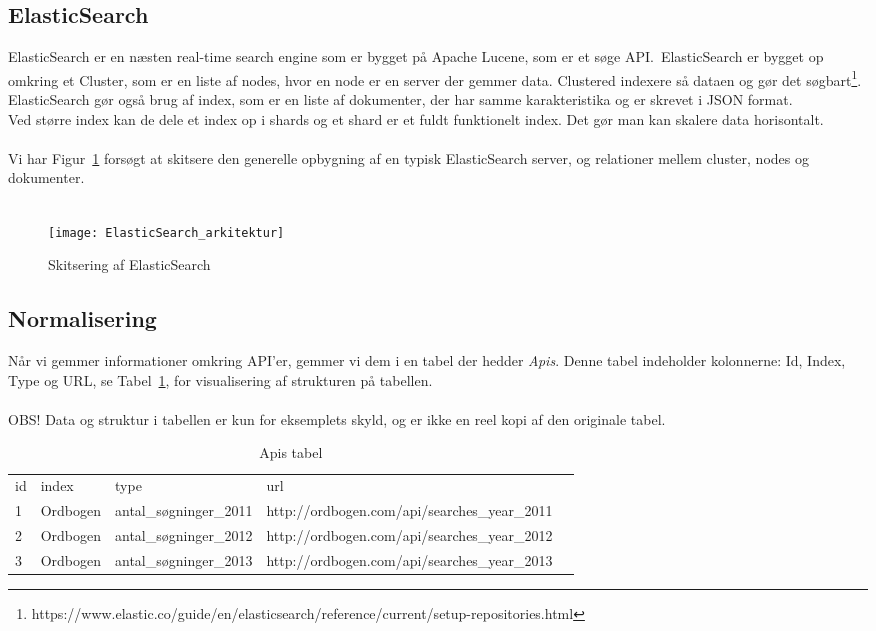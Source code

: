 \subsection{ElasticSearch}
ElasticSearch er en næsten real-time search engine som er bygget på Apache Lucene, som er et søge API.\
ElasticSearch er bygget op omkring et Cluster, som er en liste af nodes, hvor en node er en server der gemmer data. Clustered indexere så dataen og gør det søgbart\footnote{https://www.elastic.co/guide/en/elasticsearch/reference/current/setup-repositories.html}.
ElasticSearch gør også brug af index, som er en liste af dokumenter, der har samme karakteristika og er skrevet i JSON format.
\\
Ved større index kan de dele et index op i shards og et shard er et fuldt funktionelt index. Det gør man kan skalere data horisontalt.
\\\\
Vi har Figur~\ref{fig:elasticsearch-arkitektur} forsøgt at skitsere den generelle opbygning af en typisk ElasticSearch server, og relationer mellem cluster, nodes og dokumenter.
\\\\
\begin{figure}[here]
    \texttt{[image: ElasticSearch\_arkitektur]}
    \caption{Skitsering af ElasticSearch}
    \label{fig:elasticsearch-arkitektur}
\end{figure}
\subsection{Normalisering}
Når vi gemmer informationer omkring API'er, gemmer vi dem i en tabel der hedder \textit{Apis}. Denne tabel indeholder kolonnerne: Id, Index, Type og URL, se Tabel~\ref{table:api-tabel}, for visualisering af strukturen på tabellen.
\\\\
OBS! Data og struktur i tabellen er kun for eksemplets skyld, og er ikke en reel kopi af den originale tabel.
\begin{table}[here]
    \centering
    \begin{tabular}{|l|l|l|l|l}
        \cline{1-4}
        id & index  &  type &  url &  \\ \cline{1-4}
        1 & Ordbogen & antal\_søgninger\_2011 & http://ordbogen.com/api/searches\_year\_2011 &  \\ \cline{1-4}
        2 & Ordbogen & antal\_søgninger\_2012 & http://ordbogen.com/api/searches\_year\_2012 &  \\ \cline{1-4}
        3 & Ordbogen & antal\_søgninger\_2013 & http://ordbogen.com/api/searches\_year\_2013 &  \\ \cline{1-4}
    \end{tabular}
    \caption{Apis tabel}
    \label{table:api-tabel}
\end{table}


